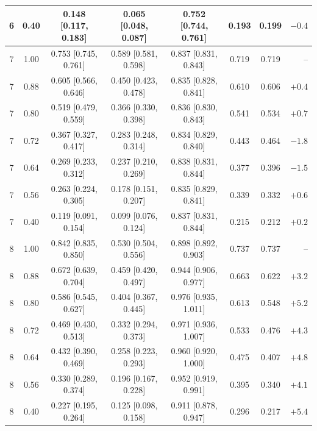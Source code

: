\begin{longtable}{cccccccr}
6 & 0.40 & 0.148 [0.117, 0.183] & 0.065 [0.048, 0.087] & 0.752 [0.744, 0.761] & 0.193 & 0.199 & $-0.4$\\
\midrule
7 & 1.00 & 0.753 [0.745, 0.761] & 0.589 [0.581, 0.598] & 0.837 [0.831, 0.843] & 0.719 & 0.719 & --\\
7 & 0.88 & 0.605 [0.566, 0.646] & 0.450 [0.423, 0.478] & 0.835 [0.828, 0.841] & 0.610 & 0.606 & $+0.4$\\
7 & 0.80 & 0.519 [0.479, 0.559] & 0.366 [0.330, 0.398] & 0.836 [0.830, 0.843] & 0.541 & 0.534 & $+0.7$\\
7 & 0.72 & 0.367 [0.327, 0.417] & 0.283 [0.248, 0.314] & 0.834 [0.829, 0.840] & 0.443 & 0.464 & $-1.8$\\
7 & 0.64 & 0.269 [0.233, 0.312] & 0.237 [0.210, 0.269] & 0.838 [0.831, 0.844] & 0.377 & 0.396 & $-1.5$\\
7 & 0.56 & 0.263 [0.224, 0.305] & 0.178 [0.151, 0.207] & 0.835 [0.829, 0.841] & 0.339 & 0.332 & $+0.6$\\
7 & 0.40 & 0.119 [0.091, 0.154] & 0.099 [0.076, 0.124] & 0.837 [0.831, 0.844] & 0.215 & 0.212 & $+0.2$\\
\midrule
8 & 1.00 & 0.842 [0.835, 0.850] & 0.530 [0.504, 0.556] & 0.898 [0.892, 0.903] & 0.737 & 0.737 & --\\
8 & 0.88 & 0.672 [0.639, 0.704] & 0.459 [0.420, 0.497] & 0.944 [0.906, 0.977] & 0.663 & 0.622 & $+3.2$\\
8 & 0.80 & 0.586 [0.545, 0.627] & 0.404 [0.367, 0.445] & 0.976 [0.935, 1.011] & 0.613 & 0.548 & $+5.2$\\
8 & 0.72 & 0.469 [0.430, 0.513] & 0.332 [0.294, 0.373] & 0.971 [0.936, 1.007] & 0.533 & 0.476 & $+4.3$\\
8 & 0.64 & 0.432 [0.390, 0.469] & 0.258 [0.223, 0.293] & 0.960 [0.920, 1.000] & 0.475 & 0.407 & $+4.8$\\
8 & 0.56 & 0.330 [0.289, 0.374] & 0.196 [0.167, 0.228] & 0.952 [0.919, 0.991] & 0.395 & 0.340 & $+4.1$\\
8 & 0.40 & 0.227 [0.195, 0.264] & 0.125 [0.098, 0.158] & 0.911 [0.878, 0.947] & 0.296 & 0.217 & $+5.4$\\
\end{longtable}
